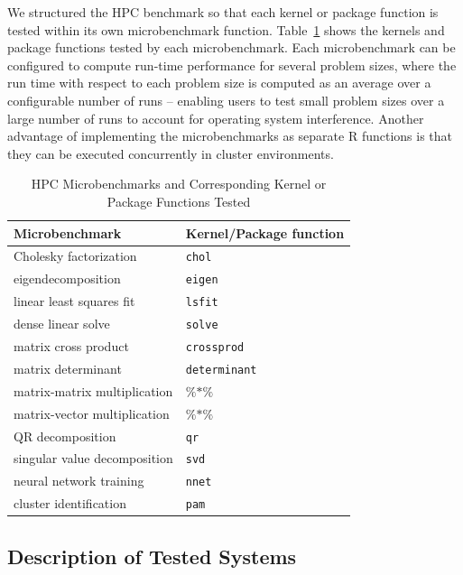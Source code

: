 We structured the HPC benchmark so that each kernel or package function is tested within
its own microbenchmark function. Table~\ref{tab:microbenchmarks} shows the kernels and
package functions tested by each microbenchmark. Each microbenchmark can be configured to
compute run-time performance for several problem sizes, where the run time with respect to
each problem size is computed as an average over a configurable number of runs -- enabling
users to test small problem sizes over a large number of runs to account for operating
system interference. Another advantage of implementing the microbenchmarks as separate R
functions is that they can be executed concurrently in cluster environments.

\begin{table}
  \caption{HPC Microbenchmarks and Corresponding Kernel or Package Functions Tested}
  \label{tab:microbenchmarks}
  \begin{tabular}{ll}
    \toprule
    Microbenchmark & Kernel/Package function \\
    \midrule
    Cholesky factorization       & \texttt{chol} \\
    eigendecomposition           & \texttt{eigen} \\
    linear least squares fit     & \texttt{lsfit} \\
    dense linear solve           & \texttt{solve} \\
    matrix cross product         & \texttt{crossprod} \\
    matrix determinant           & \texttt{determinant} \\
    matrix-matrix multiplication & $\%$$*$$\%$ \\
    matrix-vector multiplication & $\%$$*$$\%$ \\
    QR decomposition             & \texttt{qr} \\
    singular value decomposition & \texttt{svd} \\
    neural network training      & \texttt{nnet} \\
    cluster identification       & \texttt{pam} \\
    \bottomrule
  \end{tabular}
\end{table}

\subsection{Description of Tested Systems}

